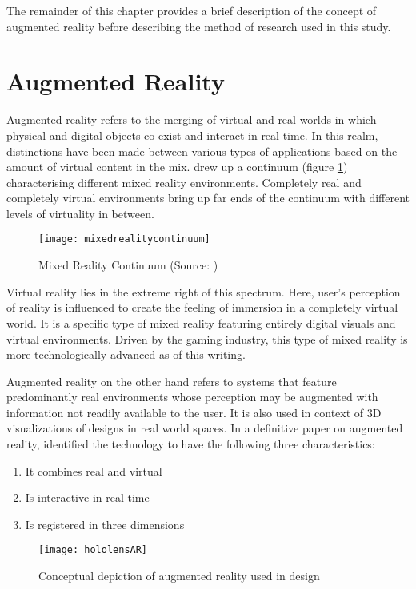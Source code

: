 The remainder of this chapter provides a brief description of the concept of augmented reality before describing the method of research used in this study.

\section{Augmented Reality}
\label{sec:augreal}
Augmented reality refers to the merging of virtual and real worlds in which physical and digital objects co-exist and interact in real time. In this realm, distinctions have been made between various types of applications based on the amount of virtual content in the mix. \cite{milgram1995augmented} drew up a continuum (figure \ref{fig:mixedrealitycontinuum}) characterising different mixed reality environments. Completely real and completely virtual environments bring up far ends of the continuum with different levels of virtuality in between. 

\begin{figure}
	\centering
	\texttt{[image: mixedrealitycontinuum]}
	\caption{Mixed Reality Continuum (Source: \cite{milgram1995augmented})}
	\label{fig:mixedrealitycontinuum}
\end{figure}

Virtual reality lies in the extreme right of this spectrum. Here, user's perception of reality is influenced to create the feeling of immersion in a completely virtual world. It is a specific type of mixed reality featuring entirely digital visuals and virtual environments. Driven by the gaming industry, this type of mixed reality is more technologically advanced as of this writing.

Augmented reality on the other hand refers to systems that feature predominantly real environments whose perception may be augmented with information not readily available to the user. It is also used in context of 3D visualizations of designs in real world spaces. In a definitive paper on augmented reality, \textcite{azuma1997survey} identified the technology to have the following three characteristics: 
\begin{enumerate}
	\item It combines real and virtual 
	\item Is interactive in real time
	\item Is registered in three dimensions
\end{enumerate} 

\begin{figure}
	\centering
	\texttt{[image: hololensAR]}
	\caption{Conceptual depiction of augmented reality used in design}
	\label{fig:augreal}
\end{figure}

